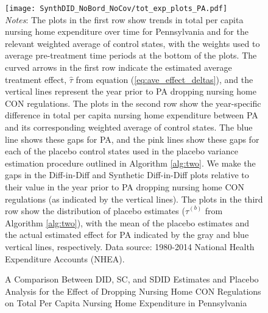\documentclass[../Main.tex]{subfiles}
\begin{document}
\newpage
{}
\begin{figure}[t] 
    \setlength{}
	\caption{\label{fig:tot_exp_plots_pa} \centering A Comparison Between DID, SC, and SDID Estimates and Placebo Analysis for the Effect of Dropping Nursing Home CON Regulations on Total Per Capita Nursing Home Expenditure in Pennsylvania} {\centering\texttt{[image: SynthDID\_NoBord\_NoCov/tot\_exp\_plots\_PA.pdf]}}
    \vspace{-1.4cm}\\
    \scriptsize
		\textit{Notes}: The plots in the first row show trends in total per capita nursing home expenditure over time for Pennsylvania and for the relevant weighted average of control states, with the weights used to average pre-treatment time periods at the bottom of the plots. The curved arrows in the first row indicate the estimated average treatment effect, $\hat{\tau}$ from equation (\ref{eq:ave_effect_deltas}), and the vertical lines represent the year prior to PA dropping nursing home CON regulations. The plots in the second row show the year-specific difference in total per capita nursing home expenditure between PA and its corresponding weighted average of control states. The blue line shows these gaps for PA, and the pink lines show these gaps for each of the placebo control states used in the placebo variance estimation procedure outlined in Algorithm \ref{alg:two}. We make the gaps in the Diff-in-Diff and Synthetic Diff-in-Diff plots relative to their value in the year prior to PA dropping nursing home CON regulations (as indicated by the vertical lines). The plots in the third row show the distribution of placebo estimates ($\hat{\tau}^{(b)}$ from Algorithm \ref{alg:two}), with the mean of the placebo estimates and the actual estimated effect for PA indicated by the gray and blue vertical lines, respectively. Data source: 1980-2014 National Health Expenditure Accounts (NHEA).
\end{figure}
\restoregeometry
\clearpage
\end{document}
